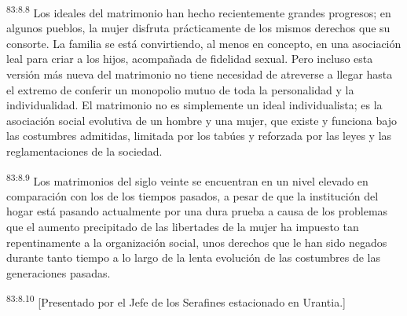 \par
\textsuperscript{83:8.8} Los ideales del matrimonio han hecho recientemente grandes progresos; en algunos pueblos, la mujer disfruta prácticamente de los mismos derechos que su consorte. La familia se está convirtiendo, al menos en concepto, en una asociación leal para criar a los hijos, acompañada de fidelidad sexual. Pero incluso esta versión más nueva del matrimonio no tiene necesidad de atreverse a llegar hasta el extremo de conferir un monopolio mutuo de toda la personalidad y la individualidad. El matrimonio no es simplemente un ideal individualista; es la asociación social evolutiva de un hombre y una mujer, que existe y funciona bajo las costumbres admitidas, limitada por los tabúes y reforzada por las leyes y las reglamentaciones de la sociedad.

\par
\textsuperscript{83:8.9} Los matrimonios del siglo veinte se encuentran en un nivel elevado en comparación con los de los tiempos pasados, a pesar de que la institución del hogar está pasando actualmente por una dura prueba a causa de los problemas que el aumento precipitado de las libertades de la mujer ha impuesto tan repentinamente a la organización social, unos derechos que le han sido negados durante tanto tiempo a lo largo de la lenta evolución de las costumbres de las generaciones pasadas.

\par
\textsuperscript{83:8.10} [Presentado por el Jefe de los Serafines estacionado en Urantia.]